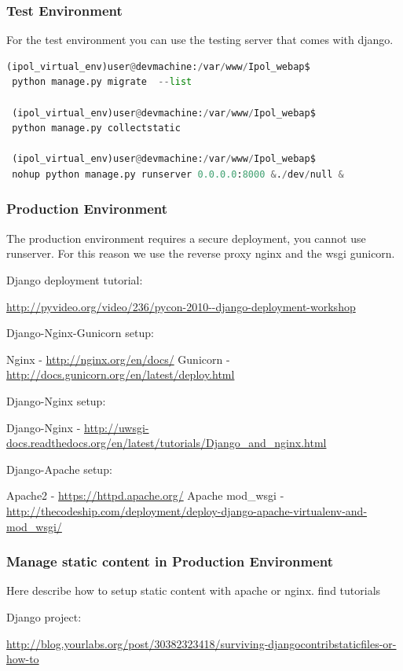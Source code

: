 \subsubsection{Test Environment}
For the test environment you can use the testing server that comes with django.

\begin{lstlisting}[language=Python,firstnumber=1]
 (ipol_virtual_env)user@devmachine:/var/www/Ipol_webap$ 
 python manage.py migrate  --list
 
 (ipol_virtual_env)user@devmachine:/var/www/Ipol_webap$ 
 python manage.py collectstatic
 
 (ipol_virtual_env)user@devmachine:/var/www/Ipol_webap$ 
 nohup python manage.py runserver 0.0.0.0:8000 &./dev/null &
\end{lstlisting}


\subsubsection{Production Environment}
The production environment requires a secure deployment, you cannot use runserver. For this reason we use the reverse proxy nginx and the wsgi gunicorn.


Django deployment tutorial:

\url{http://pyvideo.org/video/236/pycon-2010--django-deployment-workshop}


Django-Nginx-Gunicorn setup:

Nginx - \url{http://nginx.org/en/docs/}
Gunicorn - \url{http://docs.gunicorn.org/en/latest/deploy.html}


Django-Nginx setup:

Django-Nginx - \url{http://uwsgi-docs.readthedocs.org/en/latest/tutorials/Django_and_nginx.html}


Django-Apache setup:

Apache2 - \url{https://httpd.apache.org/}
Apache mod\_wsgi - \url{http://thecodeship.com/deployment/deploy-django-apache-virtualenv-and-mod_wsgi/}



\subsubsection{Manage static content in Production Environment }
Here describe how to setup static content with apache or nginx. find tutorials

Django project:

\url{http://blog.yourlabs.org/post/30382323418/surviving-djangocontribstaticfiles-or-how-to}

